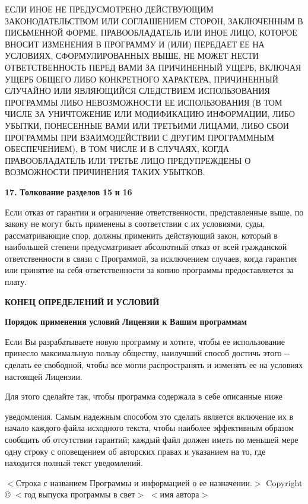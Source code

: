 ЕСЛИ ИНОЕ НЕ ПРЕДУСМОТРЕНО ДЕЙСТВУЮЩИМ ЗАКОНОДАТЕЛЬСТВОМ ИЛИ СОГЛАШЕНИЕМ СТОРОН, ЗАКЛЮЧЕННЫМ В ПИСЬМЕННОЙ ФОРМЕ, ПРАВООБЛАДАТЕЛЬ ИЛИ ИНОЕ ЛИЦО, КОТОРОЕ ВНОСИТ ИЗМЕНЕНИЯ В ПРОГРАММУ И (ИЛИ) ПЕРЕДАЕТ ЕЕ НА УСЛОВИЯХ, СФОРМУЛИРОВАННЫХ ВЫШЕ, НЕ МОЖЕТ НЕСТИ ОТВЕТСТВЕННОСТЬ ПЕРЕД ВАМИ ЗА ПРИЧИНЕННЫЙ УЩЕРБ, ВКЛЮЧАЯ УЩЕРБ ОБЩЕГО ЛИБО КОНКРЕТНОГО ХАРАКТЕРА, ПРИЧИНЕННЫЙ СЛУЧАЙНО ИЛИ ЯВЛЯЮЩИЙСЯ СЛЕДСТВИЕМ ИСПОЛЬЗОВАНИЯ ПРОГРАММЫ ЛИБО НЕВОЗМОЖНОСТИ ЕЕ ИСПОЛЬЗОВАНИЯ (В ТОМ ЧИСЛЕ ЗА УНИЧТОЖЕНИЕ ИЛИ МОДИФИКАЦИЮ ИНФОРМАЦИИ, ЛИБО УБЫТКИ, ПОНЕСЕННЫЕ ВАМИ ИЛИ ТРЕТЬИМИ ЛИЦАМИ, ЛИБО СБОИ ПРОГРАММЫ ПРИ ВЗАИМОДЕЙСТВИИ С ДРУГИМ ПРОГРАММНЫМ ОБЕСПЕЧЕНИЕМ), В ТОМ ЧИСЛЕ И В СЛУЧАЯХ, КОГДА ПРАВООБЛАДАТЕЛЬ ИЛИ ТРЕТЬЕ ЛИЦО ПРЕДУПРЕЖДЕНЫ О ВОЗМОЖНОСТИ ПРИЧИНЕНИЯ ТАКИХ УБЫТКОВ.

{\bfseries{17.}} {\bfseries{Толкование}} {\bfseries{разделов}} {\bfseries{15}} {\bfseries{и}} {\bfseries{16}}

Если отказ от гарантии и ограничение ответственности, представленные выше, по закону не могут быть применены в соответствии с их условиями, суды, рассматривающие спор, должны применить действующий закон, который в наибольшей степени предусматривает абсолютный отказ от всей гражданской ответственности в связи с Программой, за исключением случаев, когда гарантия или принятие на себя ответственности за копию программы предоставляется за плату.

{\bfseries{КОНЕЦ}} {\bfseries{ОПРЕДЕЛЕНИЙ}} {\bfseries{И}} {\bfseries{УСЛОВИЙ}}

{\bfseries{Порядок}} {\bfseries{применения}} {\bfseries{условий}} {\bfseries{Лицензии}} {\bfseries{к}} {\bfseries{Вашим}} {\bfseries{программам}}

Если Вы разрабатываете новую программу и хотите, чтобы ее использование принесло максимальную пользу обществу, наилучший способ достичь этого -\/-\/ сделать ее свободной, чтобы все могли распространять и изменять ее на условиях настоящей Лицензии.

Для этого сделайте так, чтобы программа содержала в себе описанные ниже

уведомления. Самым надежным способом это сделать является включение их в начало каждого файла исходного текста, чтобы наиболее эффективным образом сообщить об отсутствии гарантий; каждый файл должен иметь по меньшей мере одну строку с оповещением об авторских правах и указанием на то, где находится полный текст уведомлений.

\texorpdfstring{$<$}{<}Строка с названием Программы и информацией о ее назначении.\texorpdfstring{$>$}{>} Copyright © \texorpdfstring{$<$}{<}год выпуска программы в свет\texorpdfstring{$>$}{>} \texorpdfstring{$<$}{<}имя автора\texorpdfstring{$>$}{>}

